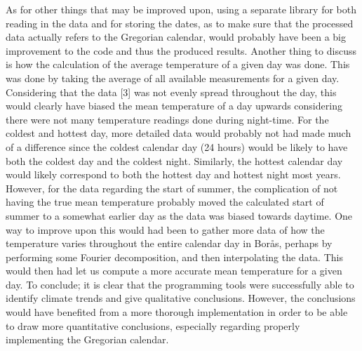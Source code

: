 \documentclass[a4, 12pt]{article}
\begin{document}
\indent As for other things that may be improved upon, using a separate library for both reading in the data and for storing the dates, as to make sure that the processed data actually refers to the Gregorian calendar, would probably have been a big improvement to the code and thus the produced results. \newline
\indent Another thing to discuss is how the calculation of the average temperature of a given day was done. This was done by taking the average of all available measurements for a given day. Considering that the data [3] was not evenly spread throughout the day, this would clearly have biased the mean temperature of a day upwards considering there were not many temperature readings done during night-time. For the coldest and hottest day, more detailed data would probably not had made much of a difference since the coldest calendar day (24 hours) would be likely to have both the coldest day and the coldest night. Similarly, the hottest calendar day would likely correspond to both the hottest day and hottest night most years. However, for the data regarding the start of summer, the complication of not having the true mean temperature probably moved the calculated start of summer to a somewhat earlier day as the data was biased towards daytime. One way to improve upon this would had been to gather more data of how the temperature varies throughout the entire calendar day in Borås, perhaps by performing some Fourier decomposition, and then interpolating the data. This would then had let us compute a more accurate mean temperature for a given day. \newline
\indent To conclude; it is clear that the programming tools were successfully able to identify climate trends and give qualitative conclusions. However, the conclusions would have benefited from a more thorough implementation in order to be able to draw more quantitative conclusions, especially regarding properly implementing the Gregorian calendar.






\end{document}
